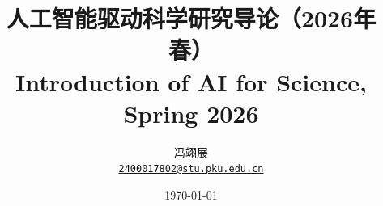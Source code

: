 \title{\textbf{人工智能驱动科学研究导论（2026年春）}\\
    Introduction of AI for Science, Spring 2026}
\author{冯翊展 \\ 
    \href{mailto:2300011515@stu.pku.edu.cn}{\normalsize{\texttt{2400017802@stu.pku.edu.cn}}}}
\date{\today}